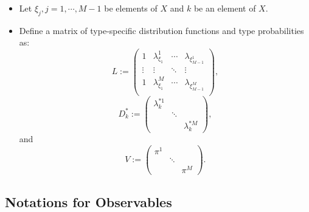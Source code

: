 \documentclass[]{book}
\providecommand{\tightlist}{%
  \setlength{\itemsep}{0pt}\setlength{\parskip}{0pt}}
\begin{document}
\begin{itemize}
\tightlist
\item
  Let \(\xi_j, j = 1, \cdots, M - 1\) be elements of \(X\) and \(k\) be
  an element of \(X\).
\item
  Define a matrix of type-specific distribution functions and type
  probabilities as: \[
  L := 
  \begin{pmatrix}
  1 & \lambda_{\xi_1}^1 & \cdots & \lambda_{\xi_{M - 1}^1}\\
  \vdots & \vdots & \ddots & \vdots \\
  1 & \lambda_{\xi_1}^M & \cdots & \lambda_{\xi_{M - 1}^M}\\
  \end{pmatrix},
  \] \[
  D_k^* :=
  \begin{pmatrix}
  \lambda_k^{*1} & & \\
  & \ddots & \\
  & & \lambda_k^{*M}
  \end{pmatrix},
  \] and \[
  V :=
  \begin{pmatrix}
  \pi^1 & & \\
  & \ddots & \\
  & & \pi^M
  \end{pmatrix}.
  \]
\end{itemize}

\subsection{Notations for Observables}\label{notations-for-observables}
\end{document}
